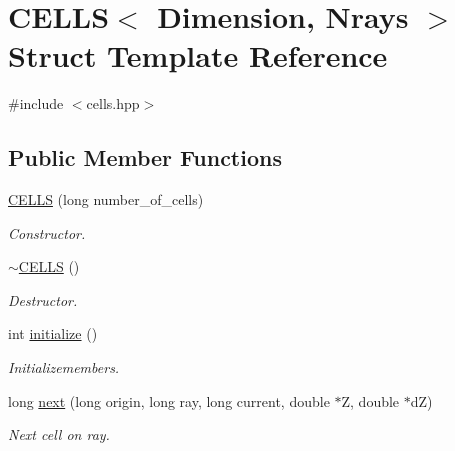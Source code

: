\hypertarget{structCELLS}{}\section{C\+E\+L\+LS$<$ Dimension, Nrays $>$ Struct Template Reference}
\label{structCELLS}


{\ttfamily \#include $<$cells.\+hpp$>$}

\subsection*{Public Member Functions}
\begin{DoxyCompactItemize}
\item 
\mbox{\label{structCELLS_a686deede740a5b0612ee4193fac0f28f}} 
\mbox{\hyperlink{structCELLS_a686deede740a5b0612ee4193fac0f28f}{C\+E\+L\+LS}} (long number\+\_\+of\+\_\+cells)
\begin{DoxyCompactList}\small\item\em Constructor. \end{DoxyCompactList}\item 
\mbox{\label{structCELLS_a14451af2a8aa1b7ebb9d3de656d18b20}} 
\mbox{\hyperlink{structCELLS_a14451af2a8aa1b7ebb9d3de656d18b20}{$\sim$\+C\+E\+L\+LS}} ()
\begin{DoxyCompactList}\small\item\em Destructor. \end{DoxyCompactList}\item 
\mbox{\label{structCELLS_ab089fb695e506952925b2cb4861aecd0}} 
int \mbox{\hyperlink{structCELLS_ab089fb695e506952925b2cb4861aecd0}{initialize}} ()
\begin{DoxyCompactList}\small\item\em Initializemembers. \end{DoxyCompactList}\item 
\mbox{\label{structCELLS_a44921a7e1fe4f959e66ef67982dd14be}} 
long \mbox{\hyperlink{structCELLS_a44921a7e1fe4f959e66ef67982dd14be}{next}} (long origin, long ray, long current, double $\ast$Z, double $\ast$dZ)
\begin{DoxyCompactList}\small\item\em Next cell on ray. \end{DoxyCompactList}\item 

\end{DoxyCompactItemize}
